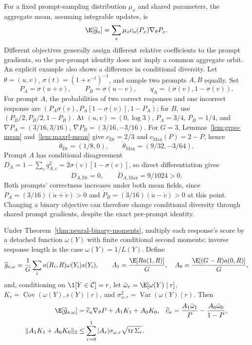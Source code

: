 \begin{remark}
\label{rem:neural-binary-shared-prompts}
For a fixed prompt-sampling distribution $\mu_x$ and shared parameters,
the aggregate mean, assuming integrable updates, is
\begin{equation}
 \E[\widehat g_a]
 =\sum_x\mu_x c_a(P_x)\nabla_\theta P_x.
 \label{eq:neural-binary-prompt-sum}
\end{equation}
Different objectives generally assign different relative coefficients to
the prompt gradients, so the per-prompt identity does not imply a common
aggregate orbit. An explicit example also shows a difference in conditional
diversity. Let $\theta=(u,v)$, $\sigma(t)=(1+e^{-t})^{-1}$, and sample two
prompts $A,B$ equally. Set
\[
 P_A=\sigma(u+v),\qquad P_B=\sigma(u-v),\qquad
 q_A=(\sigma(v),1-\sigma(v)).
\]
For prompt $A$, the probabilities of two correct responses and one incorrect
response are $(P_A\sigma(v),P_A[1-\sigma(v)],1-P_A)$; for $B$, use
$(P_B/2,P_B/2,1-P_B)$. At $(u,v)=(0,\log3)$,
$P_A=3/4$, $P_B=1/4$, and
$\nabla P_A=(3/16,3/16)$, $\nabla P_B=(3/16,-3/16)$.
For $G=3$, Lemmas~\ref{lem:grpo-mean} and~\ref{lem:maxrl-mean} give
$c_{\mathrm{Dr}}=2/3$ and $c_{\mathrm{Max}}(P)=2-P$, hence
\[
 \dot\theta_{\mathrm{Dr}}=(1/8,0),\qquad
 \dot\theta_{\mathrm{Max}}=(9/32,-3/64).
\]
Prompt $A$ has conditional disagreement
$D_A=1-\sum_cq_{A,c}^2=2\sigma(v)[1-\sigma(v)]$, so direct
differentiation gives
\[
 \dot D_{A,\mathrm{Dr}}=0,\qquad
 \dot D_{A,\mathrm{Max}}=9/1024>0.
\]
Both prompts' correctness increases under both mean fields, since
$\dot P_A=(3/16)(\dot u+\dot v)>0$ and
$\dot P_B=(3/16)(\dot u-\dot v)>0$ at this point. Changing a binary
objective can therefore change conditional diversity through shared prompt
gradients, despite the exact per-prompt identity.
\end{remark}

\begin{proposition}
\enforcehalffinalproseline
\label{prop:neural-binary-length-residual}
Under Theorem~\ref{thm:neural-binary-moments}, multiply each response's score
by a detached function $\omega(Y)$ with finite conditional second moments;
inverse response length is the case $\omega(Y)=1/L(Y)$. Define
\[
 \widehat g_{a,\omega}
 =\frac1G\sum_i a(R_i,R)\omega(Y_i)s(Y_i),\qquad
 A_1=\frac{\E[R a(1,R)]}{G},\quad
 A_0=\frac{\E[(G-R)a(0,R)]}{G},
\]
and, conditioning on $\1[Y\in\mathcal C]=r$, let
$\bar\omega_r=\E[\omega(Y)\mid r]$,
$K_r=\operatorname{Cov}(\omega(Y),s(Y)\mid r)$, and
$\sigma_{\omega,r}^2=\operatorname{Var}(\omega(Y)\mid r)$.
Then
\begin{align}
 \E[\widehat g_{a,\omega}]
 &=\widetilde c_a\nabla_\theta P+A_1K_1+A_0K_0,
 &\widetilde c_a&=\frac{A_1\bar\omega_1}{P}
                  -\frac{A_0\bar\omega_0}{1-P},
 \label{eq:neural-binary-length-residual}\\
 \|A_1K_1+A_0K_0\|_2
 &\le\sum_{r=0}^1|A_r|\sigma_{\omega,r}
                 \sqrt{\operatorname{tr}\Sigma_r}.
 \label{eq:neural-binary-length-bound}
\end{align}
\end{proposition}

